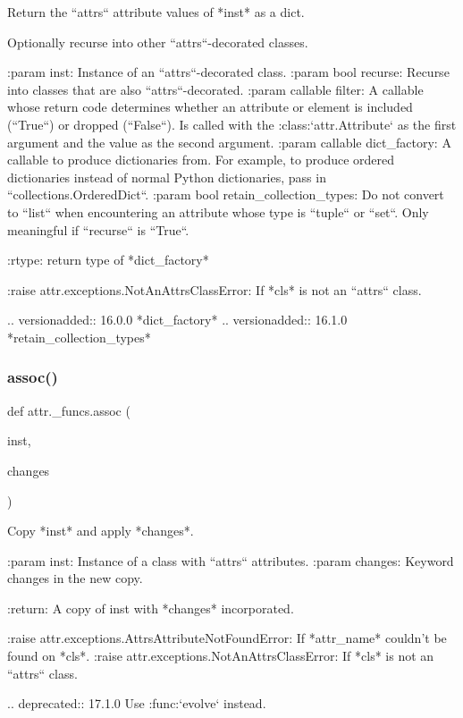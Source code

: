 \begin{DoxyVerb}Return the ``attrs`` attribute values of *inst* as a dict.

Optionally recurse into other ``attrs``-decorated classes.

:param inst: Instance of an ``attrs``-decorated class.
:param bool recurse: Recurse into classes that are also
    ``attrs``-decorated.
:param callable filter: A callable whose return code determines whether an
    attribute or element is included (``True``) or dropped (``False``).  Is
    called with the :class:`attr.Attribute` as the first argument and the
    value as the second argument.
:param callable dict_factory: A callable to produce dictionaries from.  For
    example, to produce ordered dictionaries instead of normal Python
    dictionaries, pass in ``collections.OrderedDict``.
:param bool retain_collection_types: Do not convert to ``list`` when
    encountering an attribute whose type is ``tuple`` or ``set``.  Only
    meaningful if ``recurse`` is ``True``.

:rtype: return type of *dict_factory*

:raise attr.exceptions.NotAnAttrsClassError: If *cls* is not an ``attrs``
    class.

..  versionadded:: 16.0.0 *dict_factory*
..  versionadded:: 16.1.0 *retain_collection_types*
\end{DoxyVerb}
 \mbox{\label{namespaceattr_1_1__funcs_a269a7a69e7aa34b7b39169c7025cbd5a}} 
\subsubsection{\texorpdfstring{assoc()}{assoc()}}
{\footnotesize\ttfamily def attr.\+\_\+funcs.\+assoc (\begin{DoxyParamCaption}\item[{}]{inst,  }\item[{}]{changes }\end{DoxyParamCaption})}

\begin{DoxyVerb}Copy *inst* and apply *changes*.

:param inst: Instance of a class with ``attrs`` attributes.
:param changes: Keyword changes in the new copy.

:return: A copy of inst with *changes* incorporated.

:raise attr.exceptions.AttrsAttributeNotFoundError: If *attr_name* couldn't
    be found on *cls*.
:raise attr.exceptions.NotAnAttrsClassError: If *cls* is not an ``attrs``
    class.

..  deprecated:: 17.1.0
    Use :func:`evolve` instead.
\end{DoxyVerb}
 \mbox{\label{namespaceattr_1_1__funcs_a6166d0c652fbc7bed26aafb6f92b0b76}} 
